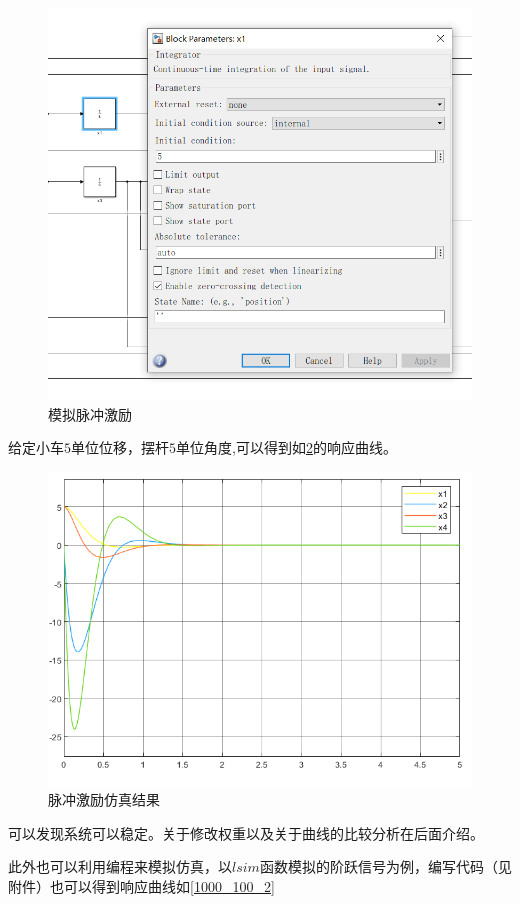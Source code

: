 \begin{figure}[hbpt]
\centering
\includegraphics[width=12cm]{initial.png}
\caption{模拟脉冲激励}\label{initial}
\end{figure}

给定小车$5$单位位移，摆杆$5$单位角度,可以得到如\ref{1000_100}的响应曲线。

\begin{figure}[hbpt]
\centering
\includegraphics[width=12cm]{1000_100.png}
\caption{脉冲激励仿真结果}\label{1000_100}
\end{figure}

可以发现系统可以稳定。关于修改权重以及关于曲线的比较分析在后面介绍。

此外也可以利用编程来模拟仿真，以$lsim$函数模拟的阶跃信号为例，编写代码（见附件）也可以得到响应曲线如\ref{1000_100_2}

